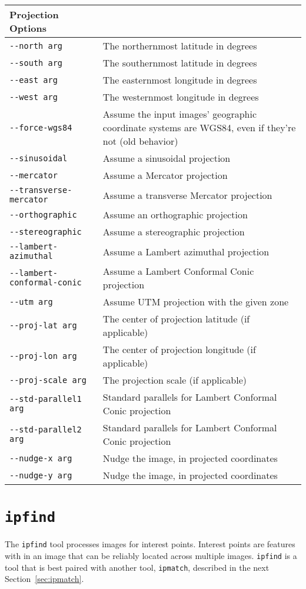 \begin{longtable}{|l|p{9cm}|}
Projection Options\\ \hline
\verb#--north arg# & The northernmost latitude in degrees\\ \hline
\verb#--south arg# & The southernmost latitude in degrees\\ \hline
\verb#--east arg# & The easternmost longitude in degrees\\ \hline
\verb#--west arg# & The westernmost longitude in degrees\\ \hline
\verb#--force-wgs84# & Assume the input images' geographic coordinate systems are WGS84, even if they're not (old behavior)\\ \hline
\verb#--sinusoidal# & Assume a sinusoidal projection\\ \hline
\verb#--mercator# & Assume a Mercator projection\\ \hline
\verb#--transverse-mercator# & Assume a transverse Mercator projection\\ \hline
\verb#--orthographic# & Assume an orthographic projection\\ \hline
\verb#--stereographic# & Assume a stereographic projection\\ \hline
\verb#--lambert-azimuthal# & Assume a Lambert azimuthal projection\\ \hline
\verb#--lambert-conformal-conic# & Assume a Lambert Conformal Conic projection\\ \hline
\verb#--utm arg# & Assume UTM projection with the given zone\\ \hline
\verb#--proj-lat arg# & The center of projection latitude (if applicable)\\ \hline
\verb#--proj-lon arg# & The center of projection longitude (if applicable)\\ \hline
\verb#--proj-scale arg# & The projection scale (if applicable)\\ \hline
\verb#--std-parallel1 arg# & Standard parallels for Lambert Conformal Conic projection\\ \hline
\verb#--std-parallel2 arg# & Standard parallels for Lambert Conformal Conic projection\\ \hline
\verb#--nudge-x arg# & Nudge the image, in projected coordinates\\ \hline
\verb#--nudge-y arg# & Nudge the image, in projected coordinates\\ \hline
\end{longtable}


\section{{\tt ipfind}}\label{sec:ipfind}
The \verb#ipfind# tool processes images for interest points. Interest points are features with in an image that can be reliably located across multiple images. \verb#ipfind# is a tool that is best paired with another tool, \verb#ipmatch#, described in the next Section~\ref{sec:ipmatch}. 

